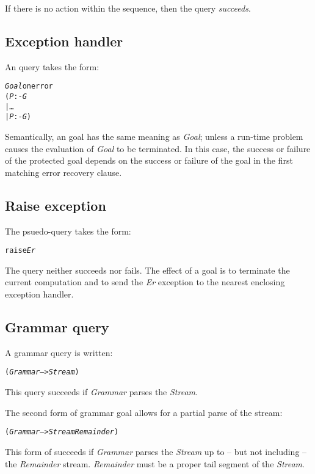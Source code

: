 If there is no  action within the sequence, then the  query \emph{succeeds}.


\subsection{Exception handler}
\label{goal:errorhandler}

An  query takes the form:
\begin{alltt}
\emph{Goal} onerror
 (\emph{P} :- \emph{G}
 | \ldots{}
 | \emph{P\subn} :- \emph{G\subn})
\end{alltt} 
Semantically, an  goal has the same meaning as \emph{Goal}; unless a run-time problem causes the evaluation of \emph{Goal} to be terminated. In this case, the  success or failure of the protected goal depends on the success or failure of the goal in the first matching error recovery clause.

\subsection{Raise exception}
\label{goal:special:exception}

The  psuedo-query takes the form:
\begin{alltt}
raise \emph{Er}
\end{alltt}
The  query neither succeeds nor fails. The effect of a  goal is to terminate the current computation and to send the \emph{Er} exception to the nearest enclosing exception handler.

\subsection{Grammar query}
\label{goal:grammar}

A grammar query is written:
\begin{alltt}
(\emph{Grammar} --> \emph{Stream})
\end{alltt}
This query succeeds if \emph{Grammar} parses the \emph{Stream}. 

The second form of grammar goal allows for a partial parse of the stream:
\begin{alltt}
(\emph{Grammar} --> \emph{Stream} \tilda \emph{Remainder})
\end{alltt}
This form of succeeds if \emph{Grammar} parses the \emph{Stream} up to -- but not including -- the \emph{Remainder} stream. \emph{Remainder} must be a proper tail segment of the \emph{Stream}. 
